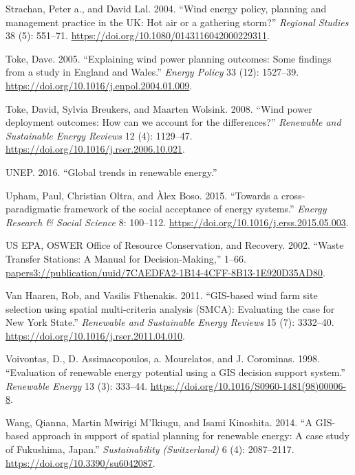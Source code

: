 \documentclass[a4paper,]{article}
\theoremstyle{definition}
\theoremstyle{definition}
\theoremstyle{definition}
\theoremstyle{remark}
\begin{document}
\leavevmode\hypertarget{ref-Strachan2004}{}%
Strachan, Peter a., and David Lal. 2004. ``Wind energy policy, planning
and management practice in the UK: Hot air or a gathering storm?''
\emph{Regional Studies} 38 (5): 551--71.
\url{https://doi.org/10.1080/0143116042000229311}.

\leavevmode\hypertarget{ref-Toke2005}{}%
Toke, Dave. 2005. ``Explaining wind power planning outcomes: Some
findings from a study in England and Wales.'' \emph{Energy Policy} 33
(12): 1527--39. \url{https://doi.org/10.1016/j.enpol.2004.01.009}.

\leavevmode\hypertarget{ref-Toke2008}{}%
Toke, David, Sylvia Breukers, and Maarten Wolsink. 2008. ``Wind power
deployment outcomes: How can we account for the differences?''
\emph{Renewable and Sustainable Energy Reviews} 12 (4): 1129--47.
\url{https://doi.org/10.1016/j.rser.2006.10.021}.

\leavevmode\hypertarget{ref-UNEP2016}{}%
UNEP. 2016. ``Global trends in renewable energy.''

\leavevmode\hypertarget{ref-Upham2015}{}%
Upham, Paul, Christian Oltra, and Àlex Boso. 2015. ``Towards a
cross-paradigmatic framework of the social acceptance of energy
systems.'' \emph{Energy Research \& Social Science} 8: 100--112.
\url{https://doi.org/10.1016/j.erss.2015.05.003}.

\leavevmode\hypertarget{ref-USEPA2002}{}%
US EPA, OSWER Office of Resource Conservation, and Recovery. 2002.
``Waste Transfer Stations: A Manual for Decision-Making,'' 1--66.
\url{papers3://publication/uuid/7CAEDFA2-1B14-4CFF-8B13-1E920D35AD80}.

\leavevmode\hypertarget{ref-VanHaaren2011}{}%
Van Haaren, Rob, and Vasilis Fthenakis. 2011. ``GIS-based wind farm site
selection using spatial multi-criteria analysis (SMCA): Evaluating the
case for New York State.'' \emph{Renewable and Sustainable Energy
Reviews} 15 (7): 3332--40.
\url{https://doi.org/10.1016/j.rser.2011.04.010}.

\leavevmode\hypertarget{ref-Voivontas1998}{}%
Voivontas, D., D. Assimacopoulos, a. Mourelatos, and J. Corominas. 1998.
``Evaluation of renewable energy potential using a GIS decision support
system.'' \emph{Renewable Energy} 13 (3): 333--44.
\url{https://doi.org/10.1016/S0960-1481(98)00006-8}.

\leavevmode\hypertarget{ref-Wang2014}{}%
Wang, Qianna, Martin Mwirigi M'Ikiugu, and Isami Kinoshita. 2014. ``A
GIS-based approach in support of spatial planning for renewable energy:
A case study of Fukushima, Japan.'' \emph{Sustainability (Switzerland)}
6 (4): 2087--2117. \url{https://doi.org/10.3390/su6042087}.
\end{document}
